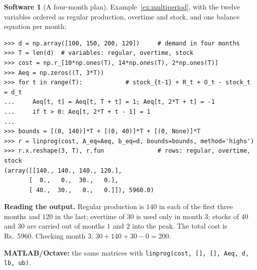 \documentclass[11pt,a4paper]{article}
\numberwithin{equation}{section}
\theoremstyle{definition}
\newtheorem{software}[thm]{Software}
\begin{document}
\begin{software}[A four-month plan]
\label{sw:multiperiod}
Example~\ref{ex:multiperiod}, with the twelve variables ordered as regular production, overtime and stock, and one balance equation per month:
{\small\begin{verbatim}
>>> d = np.array([100, 150, 200, 120])     # demand in four months
>>> T = len(d)  # variables: regular, overtime, stock
>>> cost = np.r_[10*np.ones(T), 14*np.ones(T), 2*np.ones(T)]
>>> Aeq = np.zeros((T, 3*T))
>>> for t in range(T):            # stock_{t-1} + R_t + O_t - stock_t = d_t
...     Aeq[t, t] = Aeq[t, T + t] = 1; Aeq[t, 2*T + t] = -1
...     if t > 0: Aeq[t, 2*T + t - 1] = 1
...
>>> bounds = [(0, 140)]*T + [(0, 40)]*T + [(0, None)]*T
>>> r = linprog(cost, A_eq=Aeq, b_eq=d, bounds=bounds, method='highs')
>>> r.x.reshape(3, T), r.fun               # rows: regular, overtime, stock
(array([[140., 140., 140., 120.],
       [  0.,   0.,  30.,   0.],
       [ 40.,  30.,   0.,   0.]]), 5960.0)
\end{verbatim}}
\textbf{Reading the output.} Regular production is $140$ in each of the first three months and $120$ in the last; overtime of $30$ is used only in month $3$; stocks of $40$ and $30$ are carried out of months $1$ and $2$ into the peak. The total cost is Rs.~5960. Checking month $3$: $30 + 140 + 30 - 0 = 200$.

\textbf{MATLAB/Octave:} the same matrices with \texttt{linprog(cost, [], [], Aeq, d, lb, ub)}.
\end{software}
\end{document}
